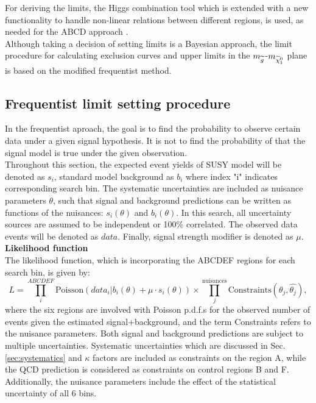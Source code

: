 For deriving the limits, the Higgs combination tool which is extended with a new functionality to handle non-linear relations between different regions, is used, as needed for the ABCD approach \cite{CLs2}.\\
Although taking a decision of setting limits is a Bayesian approach, the limit procedure for calculating exclusion curves and upper limits in the $m_{\widetilde{g}}$-$m_{\widetilde{\chi}^0_1}$ plane is based on the modified frequentist method. 
\subsection{Frequentist limit setting procedure}
In the frequentist aproach, the goal is to find the probability to observe certain data under a given signal hypothesis.
It is not to find the probability of that the signal model is true under the given observation. \\
Throughout this section, the expected event yields of SUSY model will be denoted as $s_i$, standard model background as $b_i$ where index "i" indicates corresponding search bin. The systematic uncertainties are included as nuisance parameters $\theta$, such that signal and background predictions can be written as functions of the nuisances: $s_i(\theta)$ and $b_i(\theta)$. In this search, all uncertainty sources are assumed to be independent or 100\% correlated. The observed data events will be denoted as $data$. Finally, signal strength modifier is denoted as $\mu$. \\
\textbf{Likelihood function}\\
The likelihood function, which is incorporating the ABCDEF regions for each search bin, is given by:
\begin{equation}
\label{likelihood}
  L = \prod^{ABCDEF}_i \textrm{Poisson}(data_i | b_i(\theta) + \mu \cdot s_i(\theta)) \times \prod^{\textrm{nuisances}}_j \textrm{Constraints}(\theta_j, \hat{\theta_j}),
\end{equation}
where the six regions are involved with Poisson p.d.f.s for the observed number of events given the estimated signal+background, and the term Constraints refers to the nuisance parameters. Both signal and background predictions are subject to multiple uncertainties. Systematic uncertainties which are discussed in Sec. \ref{sec:systematics} and $\kappa$ factors are included as constraints on the region A, while the QCD prediction is considered as constraints on control regions B and F. Additionally, the nuisance parameters include the effect of the statistical uncertainty of all 6 bins.\\
